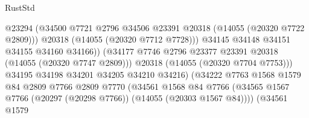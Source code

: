\begin{lexlean}{RustStd}
\begin{coremodule}
                                              @23294
                                              (@34500
                                                @7721
                                                @2796
                                                @34506
                                                @23391
                                                @20318
                                                (@14055 (@20320 @7722 @2809)))
                                              @20318
                                              (@14055 (@20320 @7712 @7728)))
                                            @34145
                                            @34148
                                            @34151
                                            @34155
                                            @34160
                                            @34166))
                                        (@34177
                                          @7746
                                          @2796
                                          @23377
                                          @23391
                                          @20318
                                          (@14055 (@20320 @7747 @2809)))
                                        @20318
                                        (@14055 (@20320 @7704 @7753)))
                                      @34195
                                      @34198
                                      @34201
                                      @34205
                                      @34210
                                      @34216)
                                    (@34222
                                      @7763
                                      @1568
                                      @1579
                                      @84
                                      @2809
                                      @7766
                                      @2809
                                      @7770
                                      (@34561
                                        @1568
                                        @84
                                        @7766
                                        (@34565
                                          @1567
                                          @7766
                                          (@20297 (@20298 @7766))
                                          (@14055 (@20303 @1567 @84))))
                                      (@34561
                                        @1579

\end{coremodule}
\end{lexlean}
